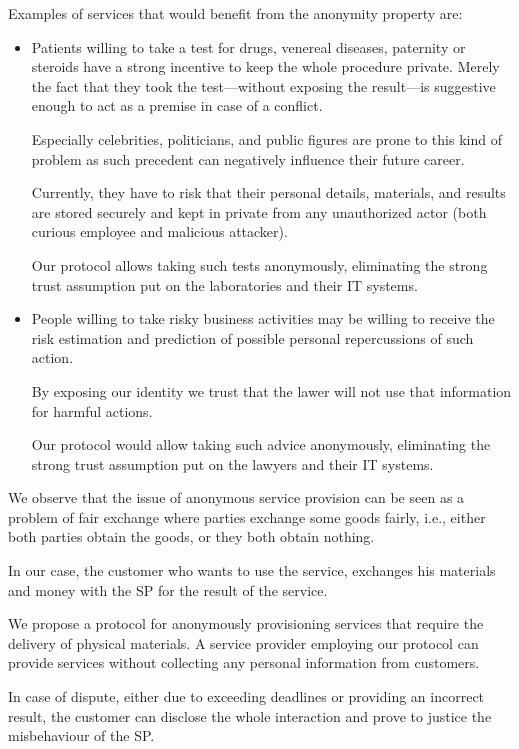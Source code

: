 \documentclass{ieeeaccess}
\begin{document}
Examples of services that would benefit from the anonymity property are:
\begin{itemize}
    \item Patients willing to take a test for drugs, venereal diseases, paternity or steroids have a strong incentive to keep the whole procedure private. Merely the fact that they took the test—without exposing the result—is suggestive enough to act as a premise in case of a conflict.

Especially celebrities, politicians, and public figures are prone to this kind of problem as such precedent can negatively influence their future career.

Currently, they have to risk that their personal details, materials, and results are stored securely and kept in private from any unauthorized actor (both curious employee and malicious attacker).

Our protocol allows taking such tests anonymously, eliminating the strong trust assumption put on the laboratories and their IT
systems.
\item People willing to take risky business activities may be willing to receive the risk estimation and prediction of possible personal repercussions of such action.

By exposing our identity we trust that the lawer will not use that information for harmful actions.

Our protocol would allow taking such advice anonymously, eliminating the strong trust assumption put on the lawyers and their IT systems.
\end{itemize}

We observe that the issue of anonymous service provision can be seen as a problem of fair exchange where parties exchange some goods fairly, i.e., either both parties obtain the goods, or they both obtain nothing.

In our case, the customer who wants to use the service, exchanges his materials and money with the SP for the result of the service.

We propose a protocol for anonymously provisioning services that require the delivery of physical materials. A service provider employing our protocol can provide services without collecting any personal information from customers.

In case of dispute, either due to exceeding deadlines or providing an incorrect result, the customer can disclose the whole interaction and prove to justice the misbehaviour of the SP.
\end{document}
